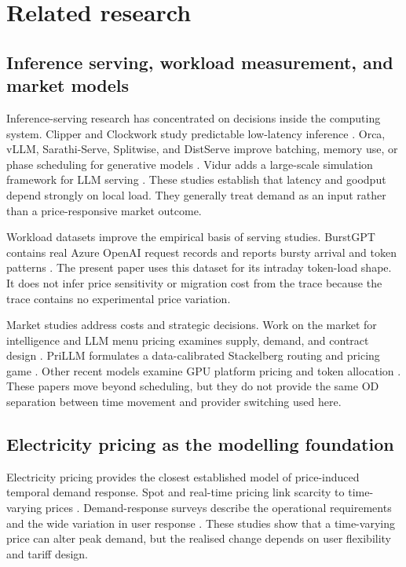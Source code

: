 \documentclass[11pt,a4paper]{article}
\begin{document}
\section{Related research}
\label{sec:related}

\subsection{Inference serving, workload measurement, and market models}

Inference-serving research has concentrated on decisions inside the computing system. Clipper and Clockwork study predictable low-latency inference \cite{crankshaw2017clipper,gujarati2020clockwork}. Orca, vLLM, Sarathi-Serve, Splitwise, and DistServe improve batching, memory use, or phase scheduling for generative models \cite{yu2022orca,kwon2023pagedattention,agrawal2024sarathiserve,patel2024splitwise,zhong2024distserve}. Vidur adds a large-scale simulation framework for LLM serving \cite{agrawal2024vidur}. These studies establish that latency and goodput depend strongly on local load. They generally treat demand as an input rather than a price-responsive market outcome.

Workload datasets improve the empirical basis of serving studies. BurstGPT contains real Azure OpenAI request records and reports bursty arrival and token patterns \cite{wang2025burstgpt}. The present paper uses this dataset for its intraday token-load shape. It does not infer price sensitivity or migration cost from the trace because the trace contains no experimental price variation.

Market studies address costs and strategic decisions. Work on the market for intelligence and LLM menu pricing examines supply, demand, and contract design \cite{demirer2025emerging,bergemann2025menu}. PriLLM formulates a data-calibrated Stackelberg routing and pricing game \cite{guo2026prillm}. Other recent models examine GPU platform pricing and token allocation \cite{yan2026stackelberg,cunningham2026token}. These papers move beyond scheduling, but they do not provide the same OD separation between time movement and provider switching used here.

\subsection{Electricity pricing as the modelling foundation}

Electricity pricing provides the closest established model of price-induced temporal demand response. Spot and real-time pricing link scarcity to time-varying prices \cite{schweppe1988spot,borenstein2005long}. Demand-response surveys describe the operational requirements and the wide variation in user response \cite{albadi2008summary,siano2014demand}. These studies show that a time-varying price can alter peak demand, but the realised change depends on user flexibility and tariff design.
\end{document}
